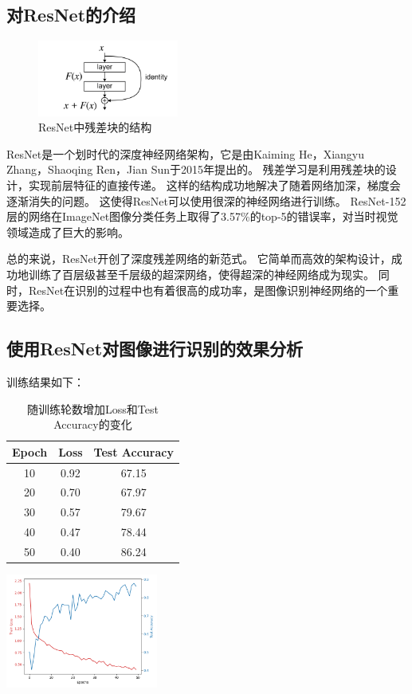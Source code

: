 \documentclass[UTF8]{ctexart}
\begin{document}
\subsection{对ResNet的介绍}

\begin{figure}
    \centering %
    \includegraphics[height=2.5cm]{../ResNet/ResBlock.png}
    \caption{ResNet中残差块的结构}
\end{figure}

ResNet是一个划时代的深度神经网络架构，它是由Kaiming He，Xiangyu Zhang，Shaoqing Ren，Jian Sun于2015年提出的。\cite{ResNet}
残差学习是利用残差块的设计，实现前层特征的直接传递。
这样的结构成功地解决了随着网络加深，梯度会逐渐消失的问题。
这使得ResNet可以使用很深的神经网络进行训练。
ResNet-152层的网络在ImageNet图像分类任务上取得了3.57\%的top-5的错误率，对当时视觉领域造成了巨大的影响。 \par

总的来说，ResNet开创了深度残差网络的新范式。
它简单而高效的架构设计，成功地训练了百层级甚至千层级的超深网络，使得超深的神经网络成为现实。
同时，ResNet在识别的过程中也有着很高的成功率，是图像识别神经网络的一个重要选择。

\subsection{使用ResNet对图像进行识别的效果分析}
训练结果如下：
\begin{table}[H]
    \begin{minipage}[b]{0.56\linewidth}
    \centering
    \begin{tabular}{c|c|c}
        \hline
        Epoch & Loss & Test Accuracy \\ \hline \hline
        10 & 0.92 & 67.15 \\ \hline
        20 & 0.70 & 67.97 \\ \hline
        30 & 0.57 & 79.67 \\ \hline
        40 & 0.47 & 78.44 \\ \hline
        50 & 0.40 & 86.24 \\ \hline
       \end{tabular}
        \caption{随训练轮数增加Loss和Test Accuracy的变化}
    \end{minipage}
    \begin{minipage}[b]{0.4\linewidth}
    \centering
    \includegraphics[width=50mm]{../ResNet/ResNet.png}
    \end{minipage}
    \end{table}
\end{document}

